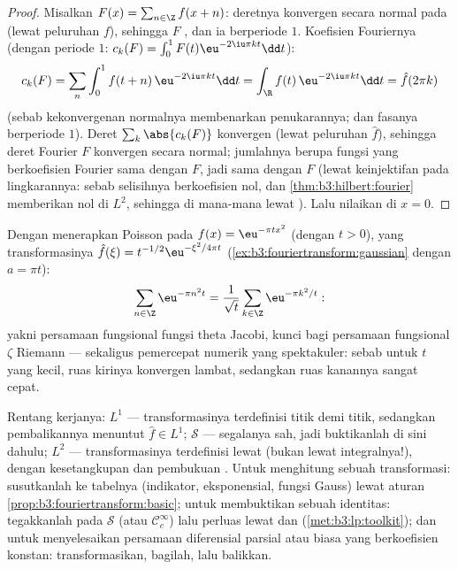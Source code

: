 \begin{proof}
Misalkan $F(x) = \sum_{n\in\Z}f(x + n)$: deretnya konvergen
secara normal pada  (lewat peluruhan $f$), sehingga $F$ , dan
ia berperiode $1$. Koefisien Fouriernya (dengan periode $1$:
$c_k(F) = \int_0^1F(t)\eu^{-2\iu\pi kt}\dd t$):
\[
c_k(F) = \sum_n\int_0^1 f(t + n)\,\eu^{-2\iu\pi kt}\dd t
= \int_\R f(t)\,\eu^{-2\iu\pi kt}\dd t = \hat f(2\pi k)
\]
(sebab kekonvergenan normalnya membenarkan penukarannya; dan fasanya
berperiode $1$). Deret $\sum_k\abs{c_k(F)}$ konvergen
(lewat peluruhan $\hat f$), sehingga deret Fourier $F$ konvergen
secara normal; jumlahnya berupa fungsi  yang berkoefisien
Fourier sama dengan $F$, jadi sama dengan $F$ (lewat keinjektifan pada
lingkarannya: sebab selisihnya berkoefisien nol, dan
\cref{thm:b3:hilbert:fourier} memberikan nol di $L^2$, sehingga
di mana-mana lewat ). Lalu nilaikan di $x = 0$.
\end{proof}

\begin{example}
\label{ex:b3:fouriertransform:theta}
Dengan menerapkan Poisson pada $f(x) = \eu^{-\pi tx^2}$ (dengan $t > 0$), yang
transformasinya $\hat f(\xi) = t^{-1/2}\eu^{-\xi^2/4\pi t}$
(\cref{ex:b3:fouriertransform:gaussian} dengan $a = \pi t$):
\[
\sum_{n\in\Z}\eu^{-\pi n^2t}
= \frac1{\sqrt t}\sum_{k\in\Z}\eu^{-\pi k^2/t} :
\]
yakni persamaan fungsional fungsi theta Jacobi, kunci bagi
persamaan fungsional $\zeta$ Riemann --- sekaligus pemercepat
numerik yang spektakuler: sebab untuk $t$ yang kecil, ruas kirinya konvergen
lambat, sedangkan ruas kanannya sangat cepat.
\end{example}

\begin{method}\label{met:b3:fouriertransform:method}
Rentang kerjanya: $L^1$ --- transformasinya terdefinisi titik demi titik,
sedangkan pembalikannya menuntut $\hat f \in L^1$; $\mathcal S$ --- segalanya
sah, jadi buktikanlah di sini dahulu; $L^2$ --- transformasinya terdefinisi lewat
 (bukan lewat integralnya!), dengan kesetangkupan  dan
pembukuan . Untuk menghitung sebuah transformasi: susutkanlah ke tabelnya
(indikator, eksponensial, fungsi Gauss) lewat aturan
\cref{prop:b3:fouriertransform:basic}; untuk membuktikan sebuah identitas:
tegakkanlah pada $\mathcal S$ (atau $\mathcal C_c^\infty$) lalu
perluas lewat  dan 
(\cref{met:b3:lp:toolkit}); dan untuk menyelesaikan persamaan diferensial parsial atau biasa yang
berkoefisien konstan: transformasikan, bagilah, lalu balikkan.
\end{method}

